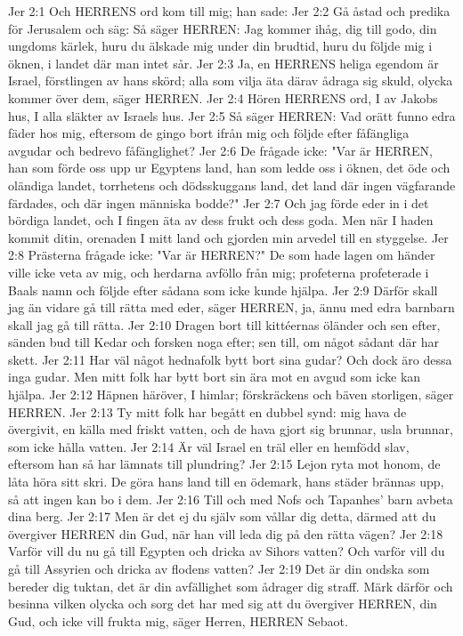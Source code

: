 Jer 2:1  Och HERRENS ord kom till mig; han sade:
Jer 2:2  Gå åstad och predika för Jerusalem och säg: Så säger HERREN: Jag kommer ihåg, dig till godo, din ungdoms kärlek, huru du älskade mig under din brudtid, huru du följde mig i öknen, i landet där man intet sår.
Jer 2:3  Ja, en HERRENS heliga egendom är Israel, förstlingen av hans skörd; alla som vilja äta därav ådraga sig skuld, olycka kommer över dem, säger HERREN.
Jer 2:4  Hören HERRENS ord, I av Jakobs hus, I alla släkter av Israels hus.
Jer 2:5  Så säger HERREN: Vad orätt funno edra fäder hos mig, eftersom de gingo bort ifrån mig och följde efter fåfängliga avgudar och bedrevo fåfänglighet?
Jer 2:6  De frågade icke: "Var är HERREN, han som förde oss upp ur Egyptens land, han som ledde oss i öknen, det öde och oländiga landet, torrhetens och dödsskuggans land, det land där ingen vägfarande färdades, och där ingen människa bodde?"
Jer 2:7  Och jag förde eder in i det bördiga landet, och I fingen äta av dess frukt och dess goda. Men när I haden kommit ditin, orenaden I mitt land och gjorden min arvedel till en styggelse.
Jer 2:8  Prästerna frågade icke: "Var är HERREN?" De som hade lagen om händer ville icke veta av mig, och herdarna avföllo från mig; profeterna profeterade i Baals namn och följde efter sådana som icke kunde hjälpa.
Jer 2:9  Därför skall jag än vidare gå till rätta med eder, säger HERREN, ja, ännu med edra barnbarn skall jag gå till rätta.
Jer 2:10  Dragen bort till kittéernas öländer och sen efter, sänden bud till Kedar och forsken noga efter; sen till, om något sådant där har skett.
Jer 2:11  Har väl något hednafolk bytt bort sina gudar? Och dock äro dessa inga gudar. Men mitt folk har bytt bort sin ära mot en avgud som icke kan hjälpa.
Jer 2:12  Häpnen häröver, I himlar; förskräckens och bäven storligen, säger HERREN.
Jer 2:13  Ty mitt folk har begått en dubbel synd: mig hava de övergivit, en källa med friskt vatten, och de hava gjort sig brunnar, usla brunnar, som icke hålla vatten.
Jer 2:14  Är väl Israel en träl eller en hemfödd slav, eftersom han så har lämnats till plundring?
Jer 2:15  Lejon ryta mot honom, de låta höra sitt skri. De göra hans land till en ödemark, hans städer brännas upp, så att ingen kan bo i dem.
Jer 2:16  Till och med Nofs och Tapanhes' barn avbeta dina berg.
Jer 2:17  Men är det ej du själv som vållar dig detta, därmed att du övergiver HERREN din Gud, när han vill leda dig på den rätta vägen?
Jer 2:18  Varför vill du nu gå till Egypten och dricka av Sihors vatten? Och varför vill du gå till Assyrien och dricka av flodens vatten?
Jer 2:19  Det är din ondska som bereder dig tuktan, det är din avfällighet som ådrager dig straff. Märk därför och besinna vilken olycka och sorg det har med sig att du övergiver HERREN, din Gud, och icke vill frukta mig, säger Herren, HERREN Sebaot.

